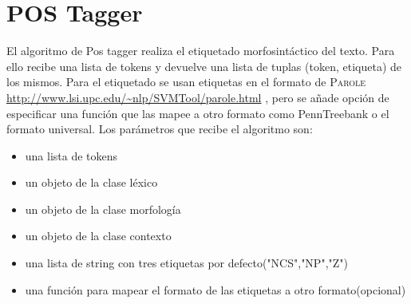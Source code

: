 \section{POS Tagger}
El algoritmo de Pos tagger realiza el etiquetado morfosintáctico del texto. Para ello recibe una lista de tokens y devuelve una lista de tuplas (token, etiqueta) de los mismos. Para el etiquetado se usan etiquetas en el formato de \textsc{Parole} \url{http://www.lsi.upc.edu/~nlp/SVMTool/parole.html} , pero se añade opción de especificar una función que las mapee a otro formato como PennTreebank o el formato universal. \newline
Los parámetros que recibe el algoritmo son: 
\begin{itemize}
\item una lista de tokens
\item un objeto de la clase léxico
\item un objeto de la clase morfología
\item un objeto de la clase contexto
\item una lista de string con tres etiquetas por defecto("NCS","NP","Z")
\item una función para mapear el formato de las etiquetas a otro formato(opcional)
\end{itemize}

